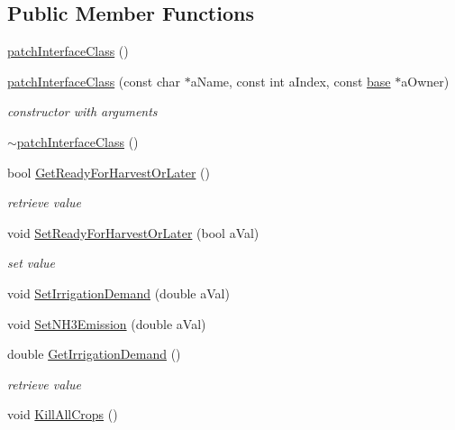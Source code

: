 \subsection*{Public Member Functions}
\begin{DoxyCompactItemize}
\item 
\hyperlink{classpatch_interface_class_a04b02c1b6c3c98fb1d1d85a3b7d3a566}{patchInterfaceClass} ()
\item 
\hyperlink{classpatch_interface_class_a2bee0718790d4edd769f1dab8df3ebf5}{patchInterfaceClass} (const char $\ast$aName, const int aIndex, const \hyperlink{classbase}{base} $\ast$aOwner)
\begin{DoxyCompactList}\small\item\em constructor with arguments \item\end{DoxyCompactList}\item 
\hyperlink{classpatch_interface_class_ad2e74958a38f300d12258ca63549e1db}{$\sim$patchInterfaceClass} ()
\item 
bool \hyperlink{classpatch_interface_class_a57fdc5494b65c610a3d3a29f8b8cfb85}{GetReadyForHarvestOrLater} ()
\begin{DoxyCompactList}\small\item\em retrieve value \item\end{DoxyCompactList}\item 
void \hyperlink{classpatch_interface_class_ad7871fad5ade318db9122ee3b6069ea0}{SetReadyForHarvestOrLater} (bool aVal)
\begin{DoxyCompactList}\small\item\em set value \item\end{DoxyCompactList}\item 
void \hyperlink{classpatch_interface_class_aaf208063e24dc0db976319ed6c69ff61}{SetIrrigationDemand} (double aVal)
\item 
void \hyperlink{classpatch_interface_class_ac5e85fb7be801cc2a3cb14da479164c0}{SetNH3Emission} (double aVal)
\item 
double \hyperlink{classpatch_interface_class_ac1b0a6001b03d5d2868f997417ffb00e}{GetIrrigationDemand} ()
\begin{DoxyCompactList}\small\item\em retrieve value \item\end{DoxyCompactList}\item 
void \hyperlink{classpatch_interface_class_a4f9fe24cb768ecc904cef91dd332f93f}{KillAllCrops} ()

\end{DoxyCompactItemize}
